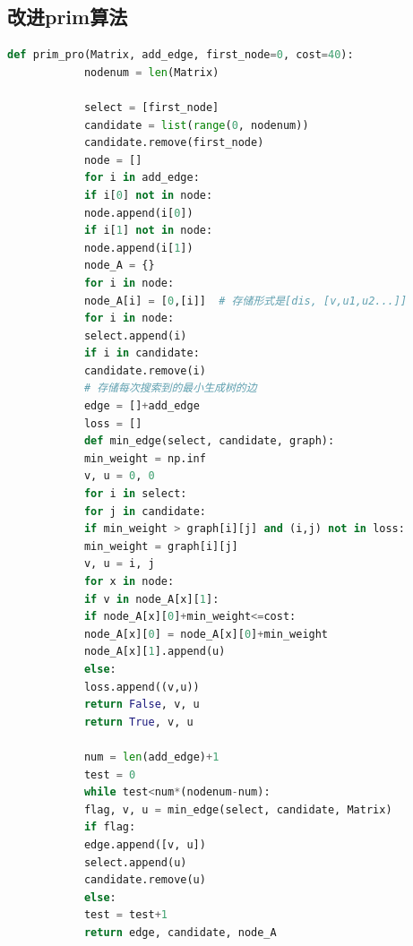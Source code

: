 \documentclass{whutmod}
\begin{document}
			\subsection*{改进prim算法}
			\begin{lstlisting}[language=python]
			def prim_pro(Matrix, add_edge, first_node=0, cost=40):
			nodenum = len(Matrix)
			
			select = [first_node]
			candidate = list(range(0, nodenum))
			candidate.remove(first_node)
			node = []
			for i in add_edge:
			if i[0] not in node:
			node.append(i[0])
			if i[1] not in node:
			node.append(i[1]) 
			node_A = {}
			for i in node:
			node_A[i] = [0,[i]]  # 存储形式是[dis, [v,u1,u2...]]
			for i in node:
			select.append(i)
			if i in candidate:
			candidate.remove(i)
			# 存储每次搜索到的最小生成树的边
			edge = []+add_edge
			loss = []
			def min_edge(select, candidate, graph):
			min_weight = np.inf
			v, u = 0, 0
			for i in select:
			for j in candidate:
			if min_weight > graph[i][j] and (i,j) not in loss:
			min_weight = graph[i][j]
			v, u = i, j
			for x in node:
			if v in node_A[x][1]:
			if node_A[x][0]+min_weight<=cost:
			node_A[x][0] = node_A[x][0]+min_weight
			node_A[x][1].append(u)
			else:
			loss.append((v,u))
			return False, v, u
			return True, v, u
			
			num = len(add_edge)+1
			test = 0
			while test<num*(nodenum-num):
			flag, v, u = min_edge(select, candidate, Matrix)
			if flag:
			edge.append([v, u])
			select.append(u)
			candidate.remove(u)
			else:
			test = test+1
			return edge, candidate, node_A
			\end{lstlisting}
\end{document}
